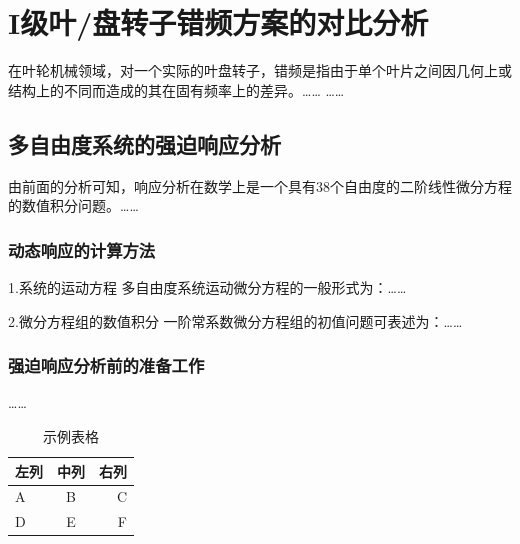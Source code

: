 \documentclass{HNUThesis}
\begin{document}
\clearpage %



\section{I级叶/盘转子错频方案的对比分析}
在叶轮机械领域，对一个实际的叶盘转子，错频是指由于单个叶片之间因几何上或结构上的不同而造成的其在固有频率上的差异。……
……
\subsection{多自由度系统的强迫响应分析}
由前面的分析可知，响应分析在数学上是一个具有38个自由度的二阶线性微分方程的数值积分问题。……
\subsubsection{动态响应的计算方法}
1.系统的运动方程	
多自由度系统运动微分方程的一般形式为：……

2.微分方程组的数值积分
一阶常系数微分方程组的初值问题可表述为：……
\subsubsection{强迫响应分析前的准备工作}
……


\begin{table}[htbp]
    \centering
    \caption{示例表格}
    \label{tab:example}
    \begin{tabular}{lcr}
    \toprule
    左列 & 中列 & 右列 \\
    \midrule
    A & B & C \\
    D & E & F \\
    \bottomrule
    \end{tabular}
    \end{table}
\end{document}
